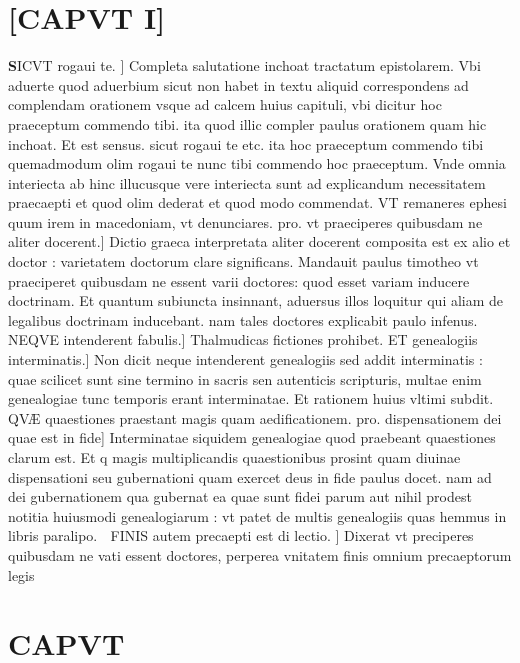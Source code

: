 \documentclass{article}
\begin{document}
\begin{pages}
\section{[CAPVT I]}
\pstart \huge\textbf{S}\normalsize ICVT rogaui te. ] Completa salutatione inchoat tractatum epistolarem. Vbi aduerte quod aduerbium sicut non habet in textu aliquid correspondens ad complendam orationem vsque ad calcem huius capituli, vbi dicitur hoc praeceptum commendo tibi. ita quod illic compler paulus orationem quam hic inchoat. Et est sensus. sicut rogaui te etc. ita hoc praeceptum commendo tibi quemadmodum olim rogaui te nunc tibi commendo hoc praeceptum. Vnde omnia interiecta ab hinc illucusque vere interiecta sunt ad explicandum necessitatem praecaepti et quod olim dederat et quod modo commendat. VT remaneres ephesi quum irem in macedoniam, vt denunciares. pro. vt praeciperes quibusdam ne aliter docerent.] Dictio graeca interpretata aliter docerent composita est ex alio et doctor : varietatem doctorum clare significans. Mandauit paulus timotheo vt praeciperet quibusdam ne essent varii doctores: quod esset variam inducere doctrinam. Et quantum subiuncta insinnant, aduersus illos loquitur qui aliam de legalibus doctrinam inducebant. nam tales doctores explicabit paulo infenus. NEQVE intenderent fabulis.] Thalmudicas fictiones prohibet. ET genealogiis interminatis.] Non dicit neque intenderent genealogiis sed addit interminatis : quae scilicet sunt sine termino in sacris sen autenticis scripturis, multae enim genealogiae tunc temporis erant interminatae. Et rationem huius vltimi subdit. QVÆ quaestiones praestant magis quam aedificationem. pro. dispensationem dei quae est in fide] Interminatae siquidem genealogiae quod praebeant quaestiones clarum est. Et q magis multiplicandis quaestionibus prosint quam diuinae dispensationi seu gubernationi quam exercet deus in fide paulus docet. nam ad dei gubernationem qua gubernat ea quae sunt fidei parum aut nihil prodest notitia huiusmodi genealogiarum : vt patet de multis genealogiis quas hemmus in libris paralipo.  FINIS autem precaepti est di lectio. ] Dixerat vt preciperes quibusdam ne vati essent doctores, perperea vnitatem finis omnium precaeptorum legis  \pend
\marginpar{[ p.140 ]}
\section*{CAPVT }

\end{pages}
\end{document}
